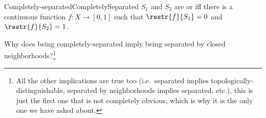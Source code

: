 \begin{dfn}{Completely-separated}{CompletelySeparated}
$S_1$ and $S_2$ are  or  iff there is a continuous function $f\colon X\rightarrow [0,1]$ such that $\restr{f}{S_1}=0$ and $\restr{f}{S_2}=1$.
\begin{rmk}
Why does being completely-separated imply being separated by closed neighborhoods?\footnote{All the other implications are true too (i.e.~separated implies topologically-distinguishable, separated by neighborhoods implies separated, etc.), this is just the first one that is not completely obvious, which is why it is the only one we have asked about.}
\end{rmk}
\end{dfn}
